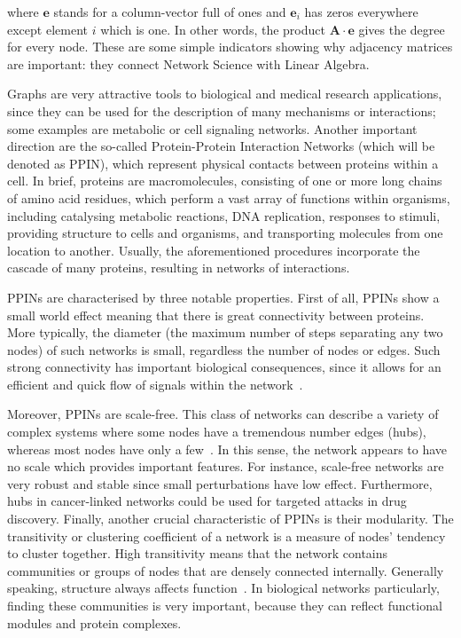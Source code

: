 \documentclass[10pt,twoside]{pnas-new}
\begin{document}
where  $\mathbf{e}$ stands for a column-vector full of ones and $\mathbf{e}_i$ has zeros everywhere except element $i$ which is one. In other words, the product $ \mathbf{A} \cdot \mathbf{e} $ gives the degree for every node. These are some simple indicators showing why adjacency matrices are important: they connect Network Science with Linear Algebra.

Graphs are very attractive tools to biological and medical research applications, since they can be used for the description of many mechanisms or interactions; some examples are metabolic or cell signaling networks. Another important direction are the so-called Protein-Protein Interaction Networks (which will be denoted as PPIN), which represent physical contacts between proteins within a cell. In brief, 
proteins are macromolecules, consisting of one or more long chains of amino acid residues, which perform a vast array of functions within organisms, including catalysing metabolic reactions, DNA replication, responses to stimuli, providing structure to cells and organisms, and transporting molecules from one location to another. Usually, the aforementioned procedures incorporate the cascade of many proteins, resulting in networks of interactions.

PPINs are characterised by three notable properties. First of all, PPINs show a small world effect meaning that there is great connectivity between proteins. More typically, the diameter (the maximum number of steps separating any two nodes) of such networks is small, regardless the number of nodes or edges. Such strong connectivity has important biological consequences, since it allows for an efficient and quick flow of signals within the network~\cite{PPINtrain}.

Moreover, PPINs are scale-free. This class of networks can describe a variety of complex systems where some nodes have a tremendous number edges (hubs), whereas most nodes have only a few~\cite{barabasi2003scale}. In this sense, the network appears to have no scale which provides important features. For instance, scale-free networks are very robust and stable since small perturbations have low effect. Furthermore, hubs in cancer-linked networks could be used for targeted attacks in drug discovery.
Finally, another crucial characteristic of PPINs is their modularity. The transitivity or clustering coefficient of a network is a measure of nodes' tendency to cluster together. High transitivity means that the network contains communities or groups of nodes that are densely connected internally. Generally speaking, structure always affects function~\cite{strogatz2001exploring}. In biological networks particularly, finding these communities is very important, because they can reflect functional modules and protein complexes.
\end{document}
